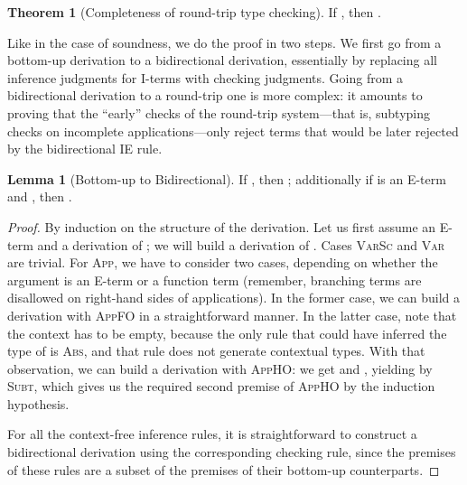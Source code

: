 \documentclass[10pt,preprint]{sigplanconf-pldi16}
\theoremstyle{definition}
\newtheorem{theorem}{Theorem}
\newtheorem{lemma}{Lemma}
\begin{document}
\begin{theorem}[Completeness of round-trip type checking]\label{thm:completeness}
If , then .
\end{theorem}

Like in the case of soundness, we do the proof in two steps.
We first go from a bottom-up derivation to a bidirectional derivation,
essentially by replacing all inference judgments for I-terms with checking judgments. 
Going from a bidirectional derivation to a round-trip one is more complex:
it amounts to proving that the ``early'' checks of the round-trip system---that is, subtyping checks on incomplete applications---only reject terms that would be later rejected by the bidirectional \textsc{IE} rule.

\begin{lemma}[Bottom-up to Bidirectional]\label{lemma:bu-to-bidir}
If , then ;
additionally if  is an E-term and , then .
\end{lemma}
\begin{proof}
By induction on the structure of the derivation.
Let us first assume an E-term  and a derivation of ;
we will build a derivation of .
Cases \textsc{VarSc} and \textsc{Var} are trivial.
For \textsc{App}, we have to consider two cases,
depending on whether the argument is an E-term or a function term
(remember, branching terms are disallowed on right-hand sides of applications).
In the former case, we can build a derivation with \textsc{AppFO} in a straightforward manner.
In the latter case, note that the context  has to be empty,
because the only rule that could have inferred the type of  is \textsc{Abs},
and that rule does not generate contextual types.
With that observation, we can build a derivation with \textsc{AppHO}: 
we get  and ,
yielding  by \textsc{Subt},
which gives us the required second premise of \textsc{AppHO} by the induction hypothesis.

For all the context-free inference rules,
it is straightforward to construct a bidirectional derivation
using the corresponding checking rule,
since the premises of these rules are a subset of the premises of their bottom-up counterparts.
\end{proof}
\end{document}
